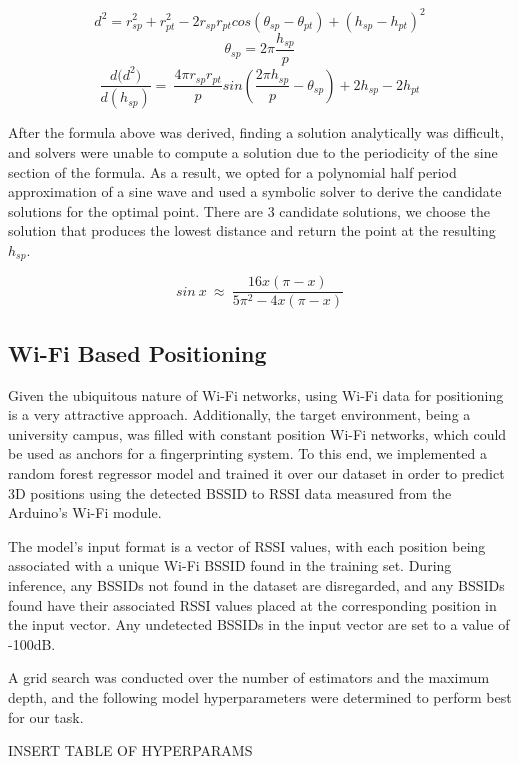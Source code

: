 $$d^2=r_{sp}^2+r_{pt}^2-2r_{sp}r_{pt}cos\left(\theta_{sp}-\theta_{pt}\right)+\left(h_{sp}-h_{pt}\right)^2$$
$$\theta_{sp}=2\pi\frac{h_{sp}}{p}$$
$$\frac{{d(d}^2)}{d(h_{sp})}=\ \frac{4\pi r_{sp}r_{pt}}{p}sin(\frac{2\pi h_{sp}}{p}-\theta_{sp})+2h_{sp}-2h_{pt}$$

After the formula above was derived, finding a solution analytically was difficult, and solvers were unable to compute a solution due to the periodicity of the sine section of the formula. As a result, we opted for a polynomial half period approximation of a sine wave  and used a symbolic solver to derive the candidate solutions for the optimal point. There are 3 candidate solutions, we choose the solution that produces the lowest distance and return the point at the resulting $h_{sp}$. 

$$sin\ x\ \approx\ \frac{16x(\pi-x)}{5\pi^2-4x(\pi-x)}$$

\subsection{Wi-Fi Based Positioning}
Given the ubiquitous nature of Wi-Fi networks, using Wi-Fi data for positioning is a very attractive approach. Additionally, the target environment, being a university campus, was filled with constant position Wi-Fi networks, which could be used as anchors for a fingerprinting system. To this end, we implemented a random forest regressor model and trained it over our dataset in order to predict 3D positions using the detected BSSID to RSSI data measured from the Arduino's Wi-Fi module. \cite{pedregosa_2011_scikitlearn}
\par

The model's input format is a vector of RSSI values, with each position being associated with a unique Wi-Fi BSSID found in the training set. During inference, any BSSIDs not found in the dataset are disregarded, and any BSSIDs found have their associated RSSI values placed at the corresponding position in the input vector. Any undetected BSSIDs in the input vector are set to a value of -100dB.
\par

A grid search was conducted over the number of estimators and the maximum depth, and the following model hyperparameters were determined to perform best for our task. 
\par
INSERT TABLE OF HYPERPARAMS
\par

